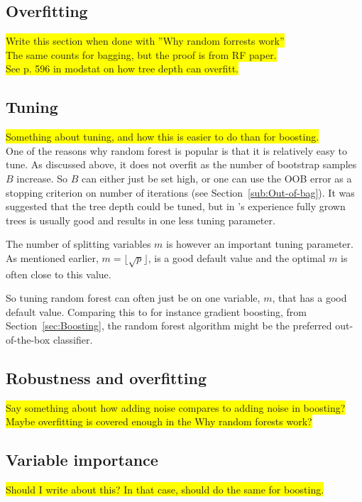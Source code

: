 \subsection{Overfitting}
\label{sub:Overfitting}
\colorbox{yellow}{Write this section when done with ''Why random forrests work''}
\\\colorbox{yellow}{The same counts for bagging, but the proof is from RF paper.}
\\\colorbox{yellow}{See p. 596 in modstat on how tree depth can overfitt.}



\subsection{Tuning}
\label{sub:Tuning}
\colorbox{yellow}{Something about tuning, and how this is easier to do than for boosting.}\\
One of the reasons why random forest is popular is that it is relatively easy to tune. As discussed above, it does not overfit as the number of bootstrap samples $B$ increase. So $B$ can either just be set high, or one can use the OOB error as a stopping criterion on number of iterations (see Section~\ref{sub:Out-of-bag}). It was suggested that the tree depth could be tuned, but in \cite{modstat}'s experience fully grown trees is usually good and results in one less tuning parameter. 

The number of splitting variables $m$ is however an important tuning parameter. As mentioned earlier, $m = \lfloor \sqrt{p} \rfloor$, is a good default value and the optimal $m$ is often close to this value. 

So tuning random forest can often just be on one variable, $m$, that has a good default value. Comparing this to for instance gradient boosting, from Section~\ref{sec:Boosting}, the random forest algorithm might be the preferred out-of-the-box classifier. 


\subsection{Robustness and overfitting}
\label{sub:Robustness and overfitting}
\colorbox{yellow}{Say something about how adding noise compares to adding noise in boosting?}
\\ \colorbox{yellow}{Maybe overfitting is covered enough in the Why random forests work?}

\subsection{Variable importance}
\label{sub:Variable importance}
\colorbox{yellow}{Should I write about this? In that case, should do the same for boosting.}
